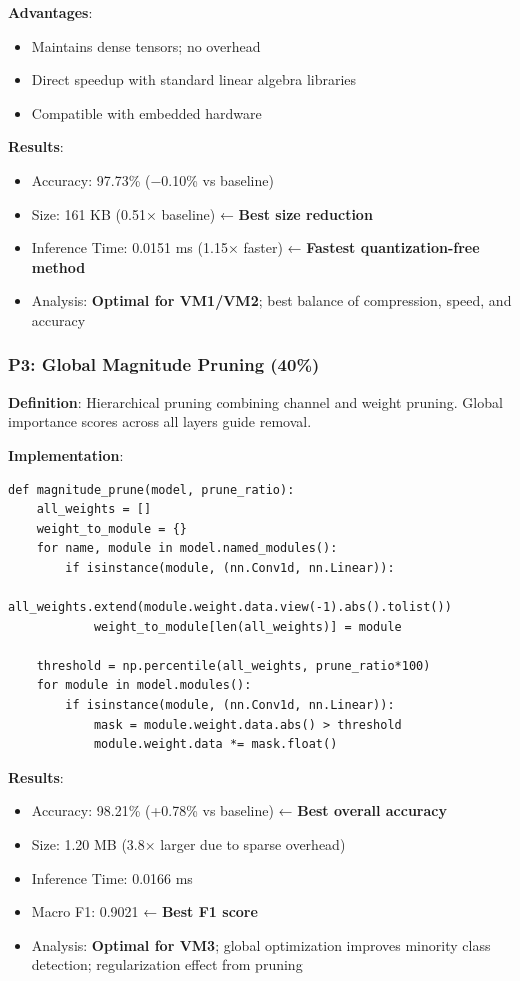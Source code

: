 \documentclass[12pt, a4paper]{article}
\begin{document}
\textbf{Advantages}:
\begin{itemize}
    \item Maintains dense tensors; no overhead
    \item Direct speedup with standard linear algebra libraries
    \item Compatible with embedded hardware
\end{itemize}

\textbf{Results}:
\begin{itemize}
    \item Accuracy: 97.73\% (−0.10\% vs baseline)
    \item Size: 161 KB (0.51× baseline) ← \textbf{Best size reduction}
    \item Inference Time: 0.0151 ms (1.15× faster) ← \textbf{Fastest quantization-free method}
    \item Analysis: \textbf{Optimal for VM1/VM2}; best balance of compression, speed, and accuracy
\end{itemize}

\subsubsection{P3: Global Magnitude Pruning (40\%)}

\textbf{Definition}: Hierarchical pruning combining channel and weight pruning. Global importance scores across all layers guide removal.

\textbf{Implementation}:
\begin{lstlisting}
def magnitude_prune(model, prune_ratio):
    all_weights = []
    weight_to_module = {}
    for name, module in model.named_modules():
        if isinstance(module, (nn.Conv1d, nn.Linear)):
            all_weights.extend(module.weight.data.view(-1).abs().tolist())
            weight_to_module[len(all_weights)] = module
    
    threshold = np.percentile(all_weights, prune_ratio*100)
    for module in model.modules():
        if isinstance(module, (nn.Conv1d, nn.Linear)):
            mask = module.weight.data.abs() > threshold
            module.weight.data *= mask.float()
\end{lstlisting}

\textbf{Results}:
\begin{itemize}
    \item Accuracy: 98.21\% (+0.78\% vs baseline) ← \textbf{Best overall accuracy}
    \item Size: 1.20 MB (3.8× larger due to sparse overhead)
    \item Inference Time: 0.0166 ms
    \item Macro F1: 0.9021 ← \textbf{Best F1 score}
    \item Analysis: \textbf{Optimal for VM3}; global optimization improves minority class detection; regularization effect from pruning
\end{itemize}
\end{document}

